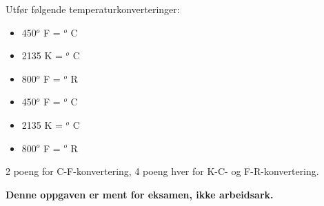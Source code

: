 

Utfør følgende temperaturkonverteringer:

\begin{itemize}
\item{} 450$^{o}$ F = \underbar{\hskip 50pt} $^{o}$ C
\vskip 5pt
\item{} 2135 K = \underbar{\hskip 50pt} $^{o}$ C
\vskip 5pt
\item{} 800$^{o}$ F = \underbar{\hskip 50pt} $^{o}$ R
\end{itemize}







\begin{itemize}
\item{} 450$^{o}$ F = $^{o}$ C
\vskip 5pt
\item{} 2135 K = $^{o}$ C
\vskip 5pt
\item{} 800$^{o}$ F = $^{o}$ R
\end{itemize}

2 poeng for C-F-konvertering, 4 poeng hver for K-C- og F-R-konvertering.







{\bf Denne oppgaven er ment for eksamen, ikke arbeidsark.}

